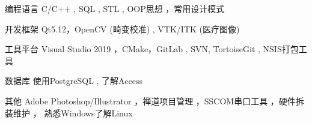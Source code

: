 
\begin{cvskills}

  \cvskill
    {编程语言} %
    {C/C++ , SQL ,  STL , OOP思想 ，常用设计模式} 

  \cvskill
    {开发框架}%
    {Qt5.12，OpenCV (畸变校准) ,  VTK/ITK (医疗图像)} 

  \cvskill
    {工具平台} %
    { Visual Studio 2019 ，CMake，GitLab , SVN, TortoiseGit , NSIS打包工具 } 

  \cvskill
    {数据库} %
    {使用PostgreSQL ,  了解Access} 

  \cvskill
    {其他} %
    {Adobe Photoshop/Illustrator ，禅道项目管理 ，SSCOM串口工具 ，硬件拆装维护 ， 熟悉Windows了解Linux} 

\end{cvskills}